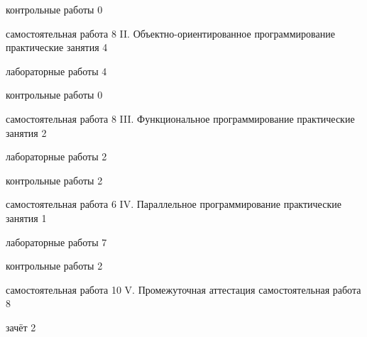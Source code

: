 контрольные работы
0


самостоятельная работа
8
II.
Объектно-ориентированное программирование
практические занятия
4


лабораторные работы
4


контрольные работы
0


самостоятельная работа
8
III.
Функциональное программирование
практические занятия
2


лабораторные работы
2


контрольные работы
2


самостоятельная работа
6
IV.
Параллельное программирование
практические занятия
1


лабораторные работы
7


контрольные работы
2


самостоятельная работа
10
V.
Промежуточная аттестация
самостоятельная работа
8


зачёт
2

